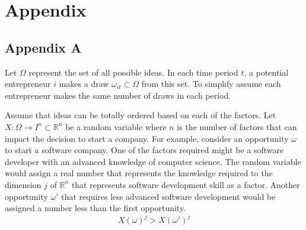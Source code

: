 \documentclass[12pt]{article}
\begin{document}
\begin{comment}

Our results point the way to future research in this area. Our results may be sensitive to for example the subsidy schedule based on income implemented in Massachusetts. In addition, more precise firm creation data sources may allow us to make stronger statements about the types of industries that benefited from health care reform.


Reasons why no result is plausible: 
People will do this anyway
Cost of insurance is not covered; still expensive. 
People disuaded small sub-sample of entrepreneurs, pre-existing conditions or those with kids but no spousal insurance or access to VC funds

However 
Long and Dahlen \footnote{Long Dahlen 2014} and Long, Stockly and Nordahl \footnote{2012} show insurance rates increased primarily among low income, childless adults. Not the demographic for entrepreneurs. 

\end{comment}

\appendix
\section*{Appendix}
\subsection*{Appendix A}

Let $\Omega$ represent the set of all possible ideas. In each time period $t$, a potential entrepreneur $i$ makes a draw $\omega_{it} \subset \Omega$ from this set. To simplify assume each entrepreneur makes the same number of draws in each period. 

Assume that ideas can be totally ordered based on each of the factors. Let $X:\Omega\to I^n \subset \mathbb{R}^n$ be a random variable where $n$ is the number of factors that can impact the decision to start a company. For example, consider an opportunity $\omega$ to start a software company. One of the factors required might be a software developer with an advanced knowledge of computer science. The random variable would assign a real number that represents the knowledge required to the dimension $j$ of $\mathbb{R}^n$ that represents software development skill as a factor. Another opportunity $\omega'$ that requires less advanced software development would be assigned a number less than the first opportunity. 
$$X(\omega)^j > X(\omega')^j $$
\end{document}
